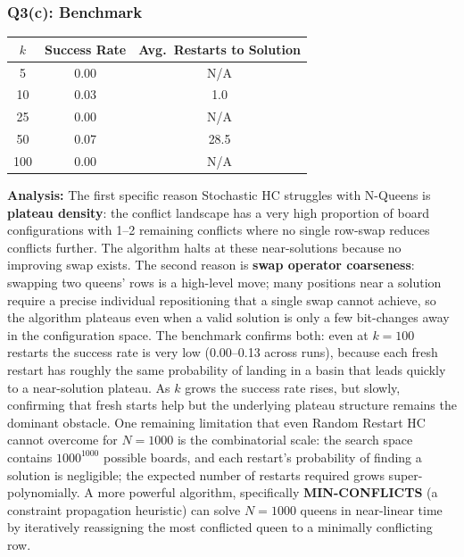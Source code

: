 \documentclass[12pt,a4paper]{article}
\begin{document}
\subsubsection*{Q3(c): Benchmark}

\begin{center}
\begin{tabular}{ccc}
\toprule
$k$ & Success Rate & Avg.\ Restarts to Solution \\
\midrule
5   & 0.00 & N/A \\
10  & 0.03 & 1.0 \\
25  & 0.00 & N/A \\
50  & 0.07 & 28.5 \\
100 & 0.00 & N/A \\
\bottomrule
\end{tabular}
\end{center}

\textbf{Analysis:}
The first specific reason Stochastic HC struggles with N-Queens is \textbf{plateau
density}: the conflict landscape has a very high proportion of board configurations
with 1--2 remaining conflicts where no single row-swap reduces conflicts further.
The algorithm halts at these near-solutions because no improving swap exists.
The second reason is \textbf{swap operator coarseness}: swapping two queens'
rows is a high-level move; many positions near a solution require a precise
individual repositioning that a single swap cannot achieve, so the algorithm
plateaus even when a valid solution is only a few bit-changes away in the
configuration space.
The benchmark confirms both: even at $k=100$ restarts the success rate is very
low (0.00--0.13 across runs), because each fresh restart has roughly the same
probability of landing in a basin that leads quickly to a near-solution plateau.
As $k$ grows the success rate rises, but slowly, confirming that fresh starts
help but the underlying plateau structure remains the dominant obstacle.
One remaining limitation that even Random Restart HC cannot overcome for $N=1000$
is the combinatorial scale: the search space contains $1000^{1000}$ possible
boards, and each restart's probability of finding a solution is negligible; the
expected number of restarts required grows super-polynomially.
A more powerful algorithm, specifically \textbf{MIN-CONFLICTS} (a constraint
propagation heuristic) can solve $N=1000$ queens in near-linear time by
iteratively reassigning the most conflicted queen to a minimally conflicting row.

\newpage
\end{document}
